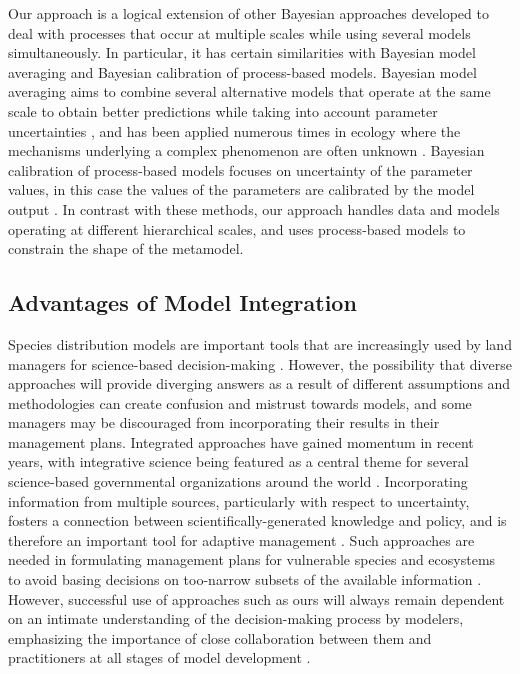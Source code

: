 \documentclass[11pt]{article}
\begin{document}
Our approach is a logical extension of other Bayesian approaches developed to deal with processes that occur at multiple scales while using several models simultaneously. 
In particular, it has certain similarities with Bayesian model averaging and Bayesian calibration of process-based models. 
Bayesian model averaging aims to combine several alternative models that operate at the same scale to obtain better predictions while taking into account parameter uncertainties \citep{Hoeting1999}, and has been applied numerous times in ecology where the mechanisms underlying a complex phenomenon are often unknown \citep[e.g.,][]{Wintle2003, Link2006}. 
Bayesian calibration of process-based models focuses on uncertainty of the parameter values, in this case the values of the parameters are calibrated by the model output \citep{VanOijen2005, Hartig2012}. 
In contrast with these methods, our approach handles data and models operating at different hierarchical scales, and uses process-based models to constrain the shape of the metamodel.



\subsection*{Advantages of Model Integration}
Species distribution models are important tools that are increasingly used by land managers for science-based decision-making \citep{Guisan2013}.
However, the possibility that diverse approaches will provide diverging answers as a result of different assumptions and methodologies can create confusion and mistrust towards models, and some managers may be discouraged from incorporating their results in their management plans. 
Integrated approaches have gained momentum in recent years, with integrative science being featured as a central theme for several science-based governmental organizations around the world \citep[e.g.,][]{Bernier2013}. 
Incorporating information from multiple sources, particularly with respect to uncertainty, fosters a connection between scientifically-generated knowledge and policy, and is therefore an important tool for adaptive management \citep[][Fig. \ref{fig:management}]{Rehme2011}.
Such approaches are needed in formulating management plans for vulnerable species and ecosystems to avoid basing decisions on too-narrow subsets of the available information \citep{Dawson2011}.
However, successful use of approaches such as ours will always remain dependent on an intimate understanding of the decision-making process by modelers, emphasizing the importance of close collaboration between them and practitioners at all stages of model development \citep{Guisan2013}.
\end{document}
